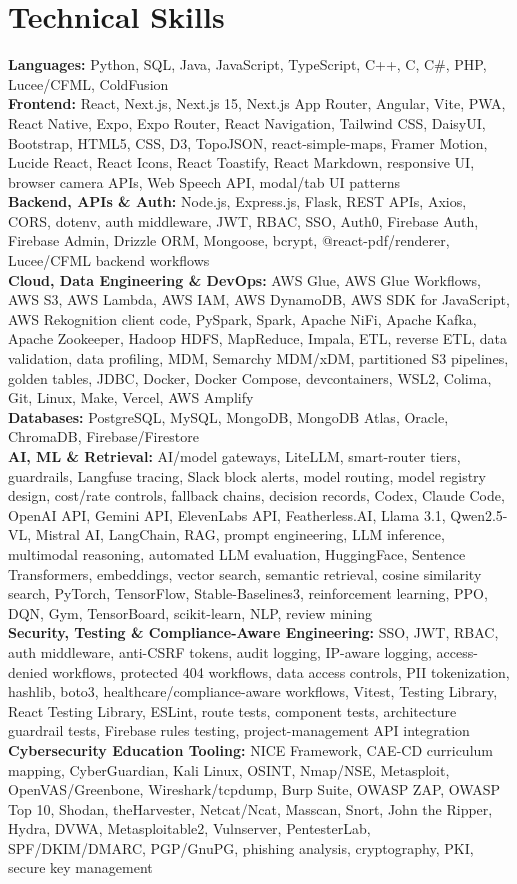 \documentclass[letterpaper,10pt]{article}
\begin{document}
\section{Technical Skills}
\textbf{Languages:} Python, SQL, Java, JavaScript, TypeScript, C++, C, C\#, PHP, Lucee/CFML, ColdFusion\\
\textbf{Frontend:} React, Next.js, Next.js 15, Next.js App Router, Angular, Vite, PWA, React Native, Expo, Expo Router, React Navigation, Tailwind CSS, DaisyUI, Bootstrap, HTML5, CSS, D3, TopoJSON, react-simple-maps, Framer Motion, Lucide React, React Icons, React Toastify, React Markdown, responsive UI, browser camera APIs, Web Speech API, modal/tab UI patterns\\
\textbf{Backend, APIs \& Auth:} Node.js, Express.js, Flask, REST APIs, Axios, CORS, dotenv, auth middleware, JWT, RBAC, SSO, Auth0, Firebase Auth, Firebase Admin, Drizzle ORM, Mongoose, bcrypt, @react-pdf/renderer, Lucee/CFML backend workflows\\
\textbf{Cloud, Data Engineering \& DevOps:} AWS Glue, AWS Glue Workflows, AWS S3, AWS Lambda, AWS IAM, AWS DynamoDB, AWS SDK for JavaScript, AWS Rekognition client code, PySpark, Spark, Apache NiFi, Apache Kafka, Apache Zookeeper, Hadoop HDFS, MapReduce, Impala, ETL, reverse ETL, data validation, data profiling, MDM, Semarchy MDM/xDM, partitioned S3 pipelines, golden tables, JDBC, Docker, Docker Compose, devcontainers, WSL2, Colima, Git, Linux, Make, Vercel, AWS Amplify\\
\textbf{Databases:} PostgreSQL, MySQL, MongoDB, MongoDB Atlas, Oracle, ChromaDB, Firebase/Firestore\\
\textbf{AI, ML \& Retrieval:} AI/model gateways, LiteLLM, smart-router tiers, guardrails, Langfuse tracing, Slack block alerts, model routing, model registry design, cost/rate controls, fallback chains, decision records, Codex, Claude Code, OpenAI API, Gemini API, ElevenLabs API, Featherless.AI, Llama 3.1, Qwen2.5-VL, Mistral AI, LangChain, RAG, prompt engineering, LLM inference, multimodal reasoning, automated LLM evaluation, HuggingFace, Sentence Transformers, embeddings, vector search, semantic retrieval, cosine similarity search, PyTorch, TensorFlow, Stable-Baselines3, reinforcement learning, PPO, DQN, Gym, TensorBoard, scikit-learn, NLP, review mining\\
\textbf{Security, Testing \& Compliance-Aware Engineering:} SSO, JWT, RBAC, auth middleware, anti-CSRF tokens, audit logging, IP-aware logging, access-denied workflows, protected 404 workflows, data access controls, PII tokenization, hashlib, boto3, healthcare/compliance-aware workflows, Vitest, Testing Library, React Testing Library, ESLint, route tests, component tests, architecture guardrail tests, Firebase rules testing, project-management API integration\\
\textbf{Cybersecurity Education Tooling:} NICE Framework, CAE-CD curriculum mapping, CyberGuardian, Kali Linux, OSINT, Nmap/NSE, Metasploit, OpenVAS/Greenbone, Wireshark/tcpdump, Burp Suite, OWASP ZAP, OWASP Top 10, Shodan, theHarvester, Netcat/Ncat, Masscan, Snort, John the Ripper, Hydra, DVWA, Metasploitable2, Vulnserver, PentesterLab, SPF/DKIM/DMARC, PGP/GnuPG, phishing analysis, cryptography, PKI, secure key management
\end{document}
